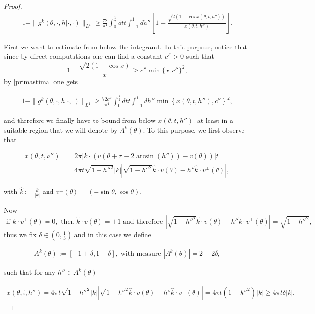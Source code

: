 \documentclass[a4paper,10pt,reqno]{amsart}
\numberwithin{equation}{subsection}
\numberwithin{figure}{subsection}
\begin{document}
\begin{proof}
\begin{align}\label{primastima}
1-\|g^k(\theta,\cdot,h|\cdot,\cdot)\|_{L^1}\geq\frac{72}{\pi^4}\int_0^{\frac{1}{2}}dtt\int_{-1}^1dh''\left[1-\frac{\sqrt{2(1-\cos x(\theta,t,h''))}}{x(\theta,t,h'')}\right].
\end{align}

First we want to estimate from below the integrand. To this purpose, notice that since by direct computations one can find a constant $c''>0$ such that
\[
1-\frac{\sqrt{2(1-\cos x)}}{x}\geq c''\min\{x,c''\}^2,
\]
by \eqref{primastima} one gets

\begin{align}\label{secondastima}
1-\|g^k(\theta,\cdot,h|\cdot,\cdot)\|_{L^1}\geq\frac{72c''}{\pi^4}\int_0^{\frac{1}{2}}dtt\int_{-1}^1dh''\min\left\{x(\theta,t,h''),c''\right\}^2,
\end{align}

and therefore we finally have to bound from below $x(\theta,t,h'')$, at least in a suitable region that we will denote by $A^k(\theta)$. To this purpose, we first observe that

\begin{align*}
x(\theta,t,h'')&=2\pi|k\cdot(v(\theta+\pi-2\arcsin(h''))-v(\theta))|t
\\
&=4\pi t\sqrt{1-h''^2}|k|\left|\sqrt{1-h''^2}\hat k\cdot v(\theta)-h''\hat k\cdot v^{\perp}(\theta)\right|,
\end{align*}

with $\hat k:=\frac{k}{|k|}$ and $v^{\perp}(\theta)=(-\sin\theta,\cos\theta)$. 

Now
{\footnotesize\[
\textrm{ if }k\cdot v^{\perp}(\theta)=0,\textrm{ then }\hat k\cdot v(\theta)=\pm1\textrm{ and therefore }\left|\sqrt{1-h''^2}\hat k\cdot v(\theta)-h''\hat k\cdot v^{\perp}(\theta)\right|=\sqrt{1-h''^2},
\]}
thus we fix $\delta\in(0,\frac{1}{3})$ and in this case we define

\begin{align}\label{misuraAkkvperp=0}
A^k(\theta):=[-1+\delta,1-\delta],\textrm{ with measure }|A^k(\theta)|=2-2\delta,
\end{align}

 such that for any $h''\in A^k(\theta)$
 
{\small\begin{align}\label{kvperp=0}
x(\theta,t,h'')=4\pi t\sqrt{1-h''^2}|k|\left|\sqrt{1-h''^2}\hat k\cdot v(\theta)-h''\hat k\cdot v^{\perp}(\theta)\right|=4\pi t(1-h''^2)|k|\geq4\pi t\delta|k|.
\end{align}}


\end{proof}
\end{document}
